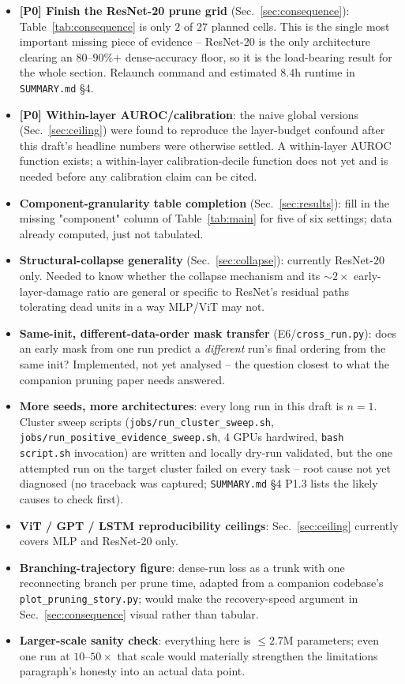 \documentclass{article}
\begin{document}
\begin{itemize}\itemsep2pt
\item \textbf{[P0] Finish the ResNet-20 prune grid} (Sec.~\ref{sec:consequence}):
  Table~\ref{tab:consequence} is only $2$ of $27$ planned cells. This is the single most
  important missing piece of evidence -- ResNet-20 is the only architecture clearing an
  $80$--$90\%$+ dense-accuracy floor, so it is the load-bearing result for the whole
  section. Relaunch command and estimated $8.4$h runtime in \texttt{SUMMARY.md} \S4.
\item \textbf{[P0] Within-layer AUROC/calibration}: the naive global versions
  (Sec.~\ref{sec:ceiling}) were found to reproduce the layer-budget confound after this
  draft's headline numbers were otherwise settled. A within-layer AUROC function exists;
  a within-layer calibration-decile function does not yet and is needed before any
  calibration claim can be cited.
\item \textbf{Component-granularity table completion} (Sec.~\ref{sec:results}): fill in
  the missing "component" column of Table~\ref{tab:main} for five of six settings; data
  already computed, just not tabulated.
\item \textbf{Structural-collapse generality} (Sec.~\ref{sec:collapse}): currently
  ResNet-20 only. Needed to know whether the collapse mechanism and its
  $\sim\!2\times$ early-layer-damage ratio are general or specific to ResNet's residual
  paths tolerating dead units in a way MLP/ViT may not.
\item \textbf{Same-init, different-data-order mask transfer} (E6/\texttt{cross\_run.py}):
  does an early mask from one run predict a \emph{different} run's final ordering from the
  same init? Implemented, not yet analysed -- the question closest to what the companion
  pruning paper needs answered.
\item \textbf{More seeds, more architectures}: every long run in this draft is $n=1$.
  Cluster sweep scripts (\texttt{jobs/run\_cluster\_sweep.sh},
  \texttt{jobs/run\_positive\_evidence\_sweep.sh}, 4 GPUs hardwired,
  \texttt{bash script.sh} invocation) are written and locally dry-run validated, but the
  one attempted run on the target cluster failed on every task -- root cause not yet
  diagnosed (no traceback was captured; \texttt{SUMMARY.md} \S4 P1.3 lists the likely
  causes to check first).
\item \textbf{ViT / GPT / LSTM reproducibility ceilings}: Sec.~\ref{sec:ceiling} currently
  covers MLP and ResNet-20 only.
\item \textbf{Branching-trajectory figure}: dense-run loss as a trunk with one
  reconnecting branch per prune time, adapted from a companion codebase's
  \texttt{plot\_pruning\_story.py}; would make the recovery-speed argument in
  Sec.~\ref{sec:consequence} visual rather than tabular.
\item \textbf{Larger-scale sanity check}: everything here is $\le 2.7$M parameters; even
  one run at $10$--$50\times$ that scale would materially strengthen the limitations
  paragraph's honesty into an actual data point.
\end{itemize}
\end{document}
